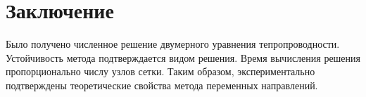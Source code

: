 \documentclass[a4paper]{article}
\begin{document}
\section{Заключение}
Было получено численное решение двумерного уравнения тепропроводности. Устойчивость метода подтверждается видом решения. Время вычисления решения пропорционально числу узлов сетки. Таким образом, экспериментально подтверждены теоретические свойства метода переменных направлений.
\end{document}
